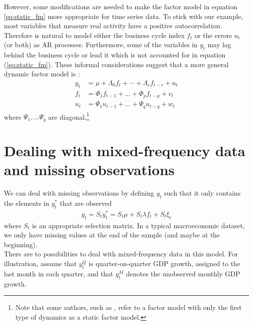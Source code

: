 However, some modifications are needed to make the factor model in equation \ref{eq:static_fm} more appropriate for time series data. To stick with our example, most variables that measure real activity have a positive autocorrelation. Therefore is natural to model either the business cycle index $f_t$ or the errors $u_t$ (or both) as AR processes. Furthermore, some of the variables in $y_t$ may lag behind the business cycle or lead it which is not accounted for in equation (\ref{eq:static_fm}). These informal considerations suggest that a more general dynamic factor model is \citep{BaiWang2015}: 
\begin{align}
y_t &= \mu + \Lambda_0 f_t + \cdots + \Lambda_{r} f_{t-r} + u_t \\
f_t &= \Phi_1 f_{t-1} + \dots + \Phi_p f_{t-p} + v_t   \\
u_{t} &= \Psi_{1} u_{t-1} + \dots + \Psi_{q} u_{t-q} + w_{t}   
\end{align}
where $\Psi_1, \dots \Psi_q$ are diagonal.\footnote{
	Note that some authors, such as \citet{BaiWang2015}, refer to a factor model with only the first type of dynamics as a static factor model.
}\\ %


\section{Dealing with mixed-frequency data and missing observations}\label{sec:mixed-frequency}

We can deal with missing observations by defining $y_t$ such that it only contains the elements in $y_t^*$ that are observed
\begin{align}
y_t = S_t y^*_t = S_t\mu + S_t \lambda f_t + S_t \xi_t
\end{align}
where $S_t$ is an appropriate selection matrix. In a typical macroeconomic dataset, we only have missing values at the end of the sample (and maybe at the beginning). \\


There are to possibilities to deal with mixed-frequency data in this model. For illustration, assume that $y_t^Q$ is quarter-on-quarter GDP growth, assigned to the last month in each quarter, and that $y_t^M$ denotes the unobserved monthly GDP growth.  

